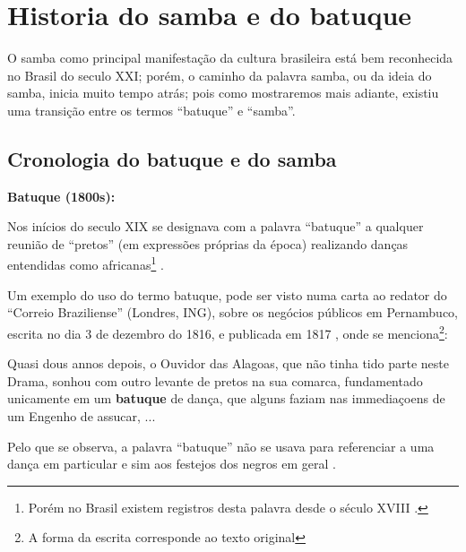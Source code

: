 
\chapter{Historia do samba e do batuque}
O samba como principal manifestação da cultura brasileira está bem reconhecida no Brasil do seculo XXI;
porém, o caminho da palavra samba, ou da ideia do samba, inicia muito tempo atrás;
pois como mostraremos mais adiante, existiu uma transição entre os termos ``batuque'' e ``samba''.


\section{Cronologia do batuque e do samba}

\begin{tcbinformation} 
\textbf{Batuque (1800s):}
\label{ref:batuquedanca1800}

Nos inícios do seculo XIX
se designava com a palavra ``batuque''  a qualquer reunião de ``pretos'' (em expressões próprias da época) realizando danças entendidas como africanas\footnote{
Porém no Brasil existem registros desta palavra desde o século XVIII \cite[pp. 85]{sandroni2001feitico}. }
\cite[pp. 54]{de4danccas} \cite[pp. 73]{lara2007memoria}.
\end{tcbinformation}
Um exemplo do uso do termo batuque, pode ser visto numa carta ao redator do ``Correio Braziliense''  (Londres, ING),
sobre os negócios públicos em Pernambuco,
escrita no dia 3 de dezembro do 1816, e publicada em 1817 \cite[pp. 468]{batuqueBraziliense},
onde se menciona\footnote{\label{footort}A forma da escrita corresponde ao texto original}:
\begin{citando}%
Quasi dous annos depois, o Ouvidor das Alagoas, que não tinha tido parte neste Drama,
sonhou com outro levante de pretos na sua comarca, 
fundamentado unicamente em um \textbf{batuque} de dança, 
que alguns faziam nas immediaçoens de um Engenho de assucar, ...
\end{citando} 
Pelo que se observa, 
a palavra ``batuque'' não se usava para referenciar a uma dança em particular e sim aos festejos dos negros em geral \cite[pp. 85]{sandroni2001feitico}.

